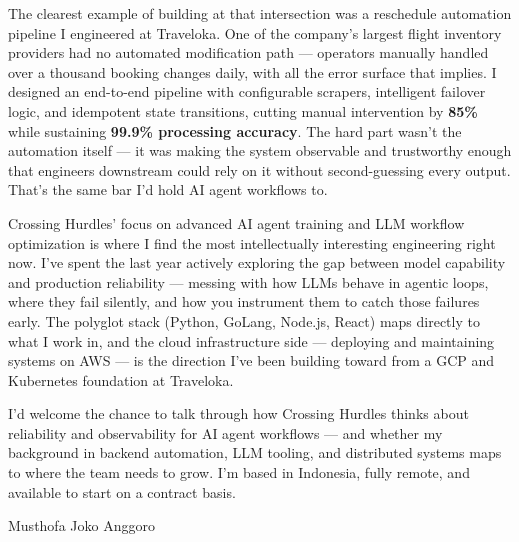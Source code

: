 \documentclass[11pt,a4paper]{article}
\begin{document}
The clearest example of building at that intersection was a reschedule automation pipeline I engineered at Traveloka. One of the company's largest flight inventory providers had no automated modification path — operators manually handled over a thousand booking changes daily, with all the error surface that implies. I designed an end-to-end pipeline with configurable scrapers, intelligent failover logic, and idempotent state transitions, cutting manual intervention by \textbf{85\%} while sustaining \textbf{99.9\% processing accuracy}. The hard part wasn't the automation itself — it was making the system observable and trustworthy enough that engineers downstream could rely on it without second-guessing every output. That's the same bar I'd hold AI agent workflows to.

\vspace{6pt}

Crossing Hurdles' focus on advanced AI agent training and LLM workflow optimization is where I find the most intellectually interesting engineering right now. I've spent the last year actively exploring the gap between model capability and production reliability — messing with how LLMs behave in agentic loops, where they fail silently, and how you instrument them to catch those failures early. The polyglot stack (Python, GoLang, Node.js, React) maps directly to what I work in, and the cloud infrastructure side — deploying and maintaining systems on AWS — is the direction I've been building toward from a GCP and Kubernetes foundation at Traveloka.

\vspace{6pt}

I'd welcome the chance to talk through how Crossing Hurdles thinks about reliability and observability for AI agent workflows — and whether my background in backend automation, LLM tooling, and distributed systems maps to where the team needs to grow. I'm based in Indonesia, fully remote, and available to start on a contract basis.

\vspace{16pt}

Musthofa Joko Anggoro
\end{document}
